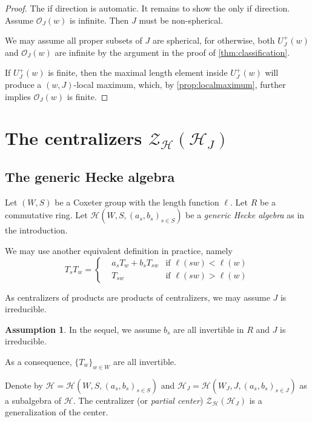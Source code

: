\documentclass[a4paper, reqno, 14pt]{amsart}
\def\co{\mathcal{O}}
\def\ch{\mathcal{H}}
\theoremstyle{definition}
\newtheorem*{ass}{Assumption}
\theoremstyle{remark}
\numberwithin{equation}{section}
\numberwithin{thm}{section}
\begin{document}
    \begin{proof}
        The if direction is automatic. It remains to show the only if direction. Assume $\co_J(w)$ is infinite. Then $J$ must be non-spherical. 
        
        We may assume all proper subsets of $J$ are spherical, for otherwise, both $U_J^+(w)$ and $\co_J(w)$ are infinite by the argument in the proof of \cref{thm:classification}. 
        
        If $U_J^+(w)$ is finite, then the maximal length element inside $U_J^+(w)$ will produce a $(w,J)$-local maximum, which, by \cref{prop:localmaximum}, further implies $\co_J(w)$ is finite.
    \end{proof}

    \section{The centralizers $\mathcal{Z}_{\ch}(\ch_J)$}
        
        \subsection{The generic Hecke algebra}
            Let $(W,S)$ be a Coxeter group with the length function $\ell$. Let $R$ be a commutative ring. Let $\ch(W,S,(a_s,b_s)_{s\in S})$ be a \emph{generic Hecke algebra} as in the introduction.

            We may use another equivalent definition in practice, namely 
           \begin{equation*}
                T_sT_w = 
                \left\{
                \begin{aligned}
                    &a_s T_{w} + b_s T_{sw} & \text{if } \ell(sw) < \ell(w) \\
                    &T_{sw} & \text{if } \ell(sw) > \ell(w)
                \end{aligned}
                \right.
            \end{equation*}
            
            As centralizers of products are products of centralizers, we may assume $J$ is irreducible.
            \begin{ass}
                In the sequel, we assume $b_s$ are all invertible in $R$ and $J$ is irreducible.
            \end{ass} 
            As a consequence, $\{T_w\}_{w\in W}$ are all invertible. 
    
        Denote by $\ch=\ch(W,S,(a_s,b_s)_{s\in S})$ and $\ch_J=\ch(W_J,J,(a_s,b_s)_{s\in J})$ as a subalgebra of $\ch$.
        The centralizer (or \emph{partial center}) $\mathcal{Z}_{\ch}(\ch_{J})$ is a generalization of the center.
\end{document}
